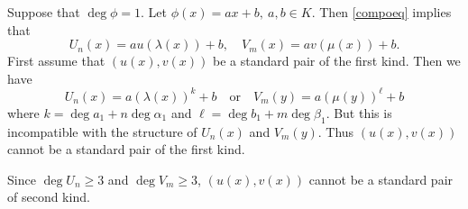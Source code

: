 \documentclass[12pt]{amsart}
\begin{document}
	Suppose that $\deg \phi=1$. Let $\phi(x)=ax+b, ~a,b\in K$. Then \eqref{compoeq} implies that 
	\begin{equation*}
		U_n(x)=au(\lambda(x))+b,\quad V_m(x)=av(\mu(x))+b.
	\end{equation*} First assume that $(u(x),v(x))$ be a standard pair of the first kind. Then we have 
    \begin{equation*}
        U_n(x)=a(\lambda(x))^{k}+b \quad \text{or} \quad V_m(y)=a(\mu(y))^{\ell}+b 
    \end{equation*}
	 where $k=\deg a_1+n \deg \alpha_1$ and $\ell=\deg b_1+m \deg \beta_1$. But this is incompatible with the structure of $U_n(x)$ and $V_m(y)$. Thus $(u(x),v(x))$ cannot be a standard pair of the first kind.
	
	Since $\deg U_n\geq 3$ and $\deg V_m\geq 3$, $(u(x),v(x))$ cannot be a standard pair of second kind.
	
\end{document}
